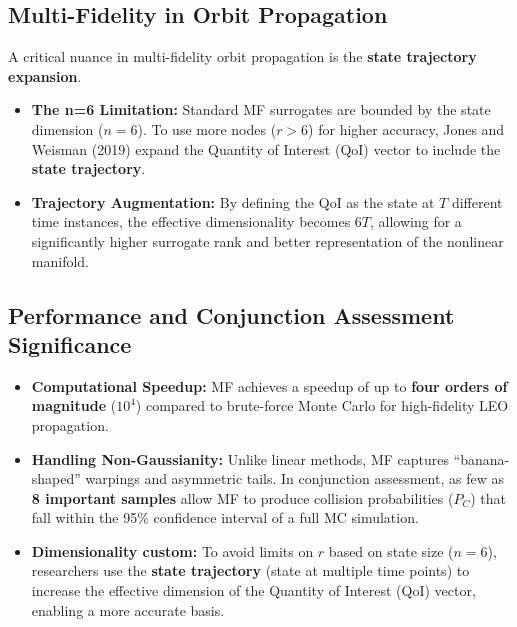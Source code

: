 \documentclass[
  letterpaper,
  DIV=11,
  numbers=noendperiod,
  oneside]{scrartcl}
\begin{document}
\subsection{Multi-Fidelity in Orbit
Propagation}\label{multi-fidelity-in-orbit-propagation}

A critical nuance in multi-fidelity orbit propagation is the
\textbf{state trajectory expansion}.

\begin{itemize}
\item
  \textbf{The n=6 Limitation:} Standard MF surrogates are bounded by the
  state dimension (\(n=6\)). To use more nodes (\(r > 6\)) for higher
  accuracy, Jones and Weisman (2019) expand the Quantity of Interest
  (QoI) vector to include the \textbf{state trajectory}.
\item
  \textbf{Trajectory Augmentation:} By defining the QoI as the state at
  \(T\) different time instances, the effective dimensionality becomes
  \(6T\), allowing for a significantly higher surrogate rank and better
  representation of the nonlinear manifold.
\end{itemize}

\subsection{Performance and Conjunction Assessment
Significance}\label{performance-and-conjunction-assessment-significance}

\begin{itemize}
\item
  \textbf{Computational Speedup:} MF achieves a speedup of up to
  \textbf{four orders of magnitude} (\(10^4\)) compared to brute-force
  Monte Carlo for high-fidelity LEO propagation.
\item
  \textbf{Handling Non-Gaussianity:} Unlike linear methods, MF captures
  ``banana-shaped'' warpings and asymmetric tails. In conjunction
  assessment, as few as \textbf{8 important samples} allow MF to produce
  collision probabilities (\(P_C\)) that fall within the 95\% confidence
  interval of a full MC simulation.
\item
  \textbf{Dimensionality custom:} To avoid limits on \(r\) based on
  state size (\(n=6\)), researchers use the \textbf{state trajectory}
  (state at multiple time points) to increase the effective dimension of
  the Quantity of Interest (QoI) vector, enabling a more accurate basis.
\end{itemize}
\end{document}
